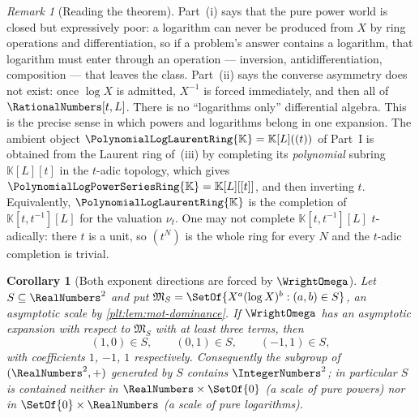 \documentclass[11pt,oneside]{article}
\theoremstyle{plain}
\newtheorem{corollary}[theorem]{Corollary}
\theoremstyle{definition}
\theoremstyle{remark}
\newtheorem{remark}[theorem]{Remark}
\newcommand{\K}{\mathbb{K}}
\newcommand{\PLpow}{\PolynomialLogPowerSeriesRing{\K}}   %
\newcommand{\PLlau}{\PolynomialLogLaurentRing{\K}}       %
\newcommand{\ordt}{\nu_{t}}                              %
\begin{document}
\begin{remark}[Reading the theorem]
\label{plt:rmk:mot-reading-minimality}
Part~(i) says that the pure power world is closed but expressively poor: a
logarithm can never be produced from \(X\) by ring operations and
differentiation, so if a problem's answer contains a logarithm, that logarithm
must enter through an operation --- inversion, antidifferentiation,
composition --- that leaves the class.  Part~(ii) says the converse asymmetry
does not exist: once \(\log X\) is admitted, \(X^{-1}\) is forced immediately,
and then all of \(\RationalNumbers[t,L]\).  There is no ``logarithms only''
differential algebra.  This is the precise sense in which powers and logarithms
belong in one expansion.
The ambient object \(\PLlau=\K[L]((t))\) of Part~I is obtained from the
Laurent ring of~(iii) by completing its \emph{polynomial} subring
\(\K[L][t]\) in the \(t\)-adic topology, which gives \(\PLpow=\K[L][[t]]\), and
then inverting \(t\).  Equivalently, \(\PLlau\) is the completion of
\(\K[t,t^{-1}][L]\) for the valuation \(\ordt\).  One may not complete
\(\K[t,t^{-1}][L]\) \(t\)-adically: there \(t\) is a unit, so \((t^{N})\) is
the whole ring for every \(N\) and the \(t\)-adic completion is trivial.
\end{remark}

\begin{corollary}[Both exponent directions are forced by \(\WrightOmega\)]
\label{plt:cor:mot-both-generators-needed}
Let \(S\subseteq\RealNumbers^{2}\) and put
\(\mathfrak{M}_{S}=\SetOf{X^{a}(\log X)^{b}:(a,b)\in S}\), an asymptotic scale
by \cref{plt:lem:mot-dominance}.  If \(\WrightOmega\) has an asymptotic
expansion with respect to \(\mathfrak{M}_{S}\) with at least three terms, then
\[
  (1,0)\in S,\qquad (0,1)\in S,\qquad (-1,1)\in S,
\]
with coefficients \(1\), \(-1\), \(1\) respectively.  Consequently the subgroup
of \((\RealNumbers^{2},+)\) generated by \(S\) contains
\(\IntegerNumbers^{2}\); in particular \(S\) is contained neither in
\(\RealNumbers\times\SetOf{0}\) (a scale of pure powers) nor in
\(\SetOf{0}\times\RealNumbers\) (a scale of pure logarithms).
\end{corollary}
\end{document}
